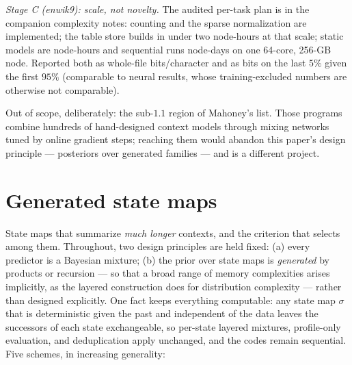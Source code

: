 \documentclass[11pt]{article}
\begin{document}
\emph{Stage C (enwik9): scale, not novelty.}  The audited per-task
plan is in the companion complexity notes: counting and the sparse
normalization are implemented; the table store builds in under two
node-hours at that scale; static models are node-hours and
sequential runs node-days on one 64-core, 256-GB node.  Reported
both as whole-file bits/character and as bits on the last $5\%$
given the first $95\%$ (comparable to neural results, whose
training-excluded numbers are otherwise not comparable).

Out of scope, deliberately: the sub-$1.1$ region of Mahoney's list.
Those programs combine hundreds of hand-designed context models
through mixing networks tuned by online gradient steps; reaching
them would abandon this paper's design principle --- posteriors over
generated families --- and is a different project.

\section{Generated state maps}
\label{sec:outlook}

State maps that summarize \emph{much longer} contexts, and the
criterion that selects among them.  Throughout, two design principles are held fixed:
(a) every predictor is a Bayesian mixture; (b) the prior over state
maps is \emph{generated} by products or recursion --- so that a broad
range of memory complexities arises implicitly, as the layered
construction does for distribution complexity --- rather than designed
explicitly.  One fact keeps everything computable: any state map
$\sigma$ that is deterministic given the past and independent of the
data leaves the successors of each state exchangeable, so per-state
layered mixtures, profile-only evaluation, and deduplication apply
unchanged, and the codes remain sequential.  Five schemes, in
increasing generality:
\end{document}

